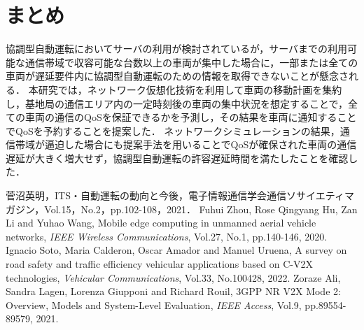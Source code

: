 \documentclass[a4paper,10pt,twocolumn,uplatex]{jsarticle}
\begin{document}
\section{まとめ}
協調型自動運転においてサーバの利用が検討されているが，サーバまでの利用可能な通信帯域で収容可能な台数以上の車両が集中した場合に，一部または全ての車両が遅延要件内に協調型自動運転のための情報を取得できないことが懸念される．
本研究では，ネットワーク仮想化技術を利用して車両の移動計画を集約し，基地局の通信エリア内の一定時刻後の車両の集中状況を想定することで，全ての車両の通信のQoSを保証できるかを予測し，その結果を車両に通知することでQoSを予約することを提案した．
ネットワークシミュレーションの結果，通信帯域が逼迫した場合にも提案手法を用いることでQoSが確保された車両の通信遅延が大きく増大せず，協調型自動運転の許容遅延時間を満たしたことを確認した．

\footnotesize{
  \begin{thebibliography}{99}
     菅沼英明，ITS・自動運転の動向と今後，電子情報通信学会通信ソサイエティマガジン，Vol.15，No.2，pp.102-108，2021．
     Fuhui Zhou, Rose Qingyang Hu, Zan Li and Yuhao Wang, Mobile edge computing in unmanned aerial vehicle networks, \textit{IEEE Wireless Communications}, Vol.27, No.1, pp.140-146, 2020.
     Ignacio Soto, Maria Calderon, Oscar Amador and Manuel Uruena, A survey on road safety and traffic efficiency vehicular applications based on C-V2X technologies, \textit{Vehicular Communications}, Vol.33, No.100428, 2022.
     Zoraze Ali, Sandra Lagen, Lorenza Giupponi and Richard Rouil, 3GPP NR V2X Mode 2: Overview, Models and System-Level Evaluation, \textit{IEEE Access},
    Vol.9, pp.89554-89579, 2021.
  \end{thebibliography}
}

% 
% 

\end{document}
